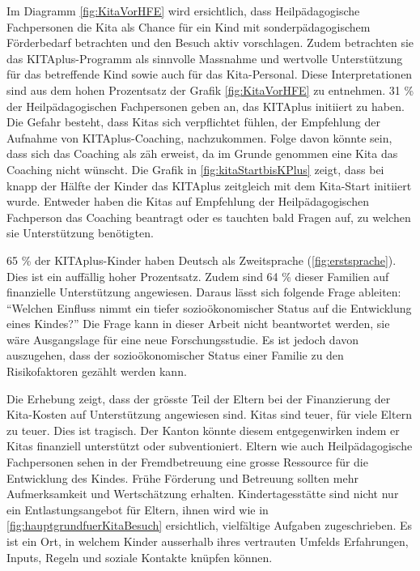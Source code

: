 \documentclass[
  ngerman,
  11pt,
  paper=a4,
  twoside,
  titlepage=true,
  openright,
  abstract=on,
  toc=listofnumbered,
  numbers=noenddot,
  chapterprefix=true,
  headings=optiontohead,
  svgnames,
  dvipsnames]{scrreprt}
\begin{document}
Im Diagramm \cref{fig:KitaVorHFE} wird ersichtlich, dass
Heilpädagogische Fachpersonen die Kita als Chance für ein Kind mit
sonderpädagogischem Förderbedarf betrachten und den Besuch aktiv
vorschlagen. Zudem betrachten sie das KITAplus-Programm als sinnvolle
Massnahme und wertvolle Unterstützung für das betreffende Kind sowie
auch für das Kita-Personal. Diese Interpretationen sind aus dem hohen
Prozentsatz der Grafik \cref{fig:KitaVorHFE} zu entnehmen. 31 \% der
Heilpädagogischen Fachpersonen geben an, das KITAplus initiiert zu
haben. Die Gefahr besteht, dass Kitas sich verpflichtet fühlen, der
Empfehlung der Aufnahme von KITAplus-Coaching, nachzukommen. Folge davon
könnte sein, dass sich das Coaching als zäh erweist, da im Grunde
genommen eine Kita das Coaching nicht wünscht. Die Grafik in
\cref{fig:kitaStartbisKPlus} zeigt, dass bei knapp der Hälfte der Kinder
das KITAplus zeitgleich mit dem Kita-Start initiiert wurde. Entweder
haben die Kitas auf Empfehlung der Heilpädagogischen Fachperson das
Coaching beantragt oder es tauchten bald Fragen auf, zu welchen sie
Unterstützung benötigten.

65 \% der KITAplus-Kinder haben Deutsch als Zweitsprache
(\cref{fig:erstsprache}). Dies ist ein auffällig hoher Prozentsatz.
Zudem sind 64 \% dieser Familien auf finanzielle Unterstützung
angewiesen. Daraus lässt sich folgende Frage ableiten: “Welchen Einfluss
nimmt ein tiefer sozioökonomischer Status auf die Entwicklung eines
Kindes?” Die Frage kann in dieser Arbeit nicht beantwortet werden, sie
wäre Ausgangslage für eine neue Forschungsstudie. Es ist jedoch davon
auszugehen, dass der sozioökonomischer Status einer Familie zu den
Risikofaktoren gezählt werden kann.

Die Erhebung zeigt, dass der grösste Teil der Eltern bei der
Finanzierung der Kita-Kosten auf Unterstützung angewiesen sind. Kitas
sind teuer, für viele Eltern zu teuer. Dies ist tragisch. Der Kanton
könnte diesem entgegenwirken indem er Kitas finanziell unterstützt oder
subventioniert. Eltern wie auch Heilpädagogische Fachpersonen sehen in
der Fremdbetreuung eine grosse Ressource für die Entwicklung des Kindes.
Frühe Förderung und Betreuung sollten mehr Aufmerksamkeit und
Wertschätzung erhalten. Kindertagesstätte sind nicht nur ein
Entlastungsangebot für Eltern, ihnen wird wie in
\cref{fig:hauptgrundfuerKitaBesuch} ersichtlich, vielfältige Aufgaben
zugeschrieben. Es ist ein Ort, in welchem Kinder ausserhalb ihres
vertrauten Umfelds Erfahrungen, Inputs, Regeln und soziale Kontakte
knüpfen können.
\end{document}
